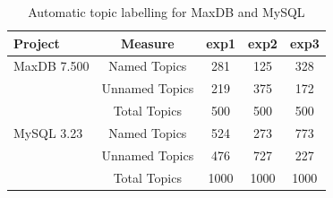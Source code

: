 \documentclass[]{sig-alternate}
\begin{document}
\begin{table}

	\centering
\begin{tabular}{l|c|c|c|c}
\toprule
\textbf{Project} & \textbf{Measure} & \textsf{exp1} & \textsf{exp2} & \textsf{exp3} \\
\midrule



MaxDB 7.500 & Named Topics   & 281 & 125 & 328 \\ %
 & Unnamed Topics & 219  & 375 &  172  \\
 & Total  Topics  & 500 & 500 & 500 \\
\midrule
MySQL 3.23  & Named Topics   & 524 & 273 & 773 \\
  & Unnamed Topics & 476 & 727 & 227 \\
  & Total  Topics  & 1000 & 1000 & 1000 \\


\bottomrule
\end{tabular}
	\caption{Automatic topic labelling for MaxDB and MySQL}%
	\label{tbl:wordlist}

\end{table}
\end{document}
